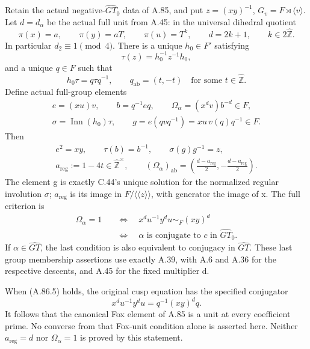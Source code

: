 Retain the actual negative-\(\widehat{GT}_0\) data of A.85,
and put \(z=(xy)^{-1}\), \(G_v=F\rtimes\langle v\rangle\).
Let \(d=d_\alpha\) be the actual full unit from A.45:
in the universal dihedral quotient
\[
 \pi(x)=a,\qquad\pi(y)=aT,\qquad\pi(u)=T^k,
 \qquad d=2k+1,\qquad k\in2\widehat{\mathbb Z}.
 \tag{A.86.1}
\]
In particular \(d_2\equiv1\pmod4\). There is a unique
\(h_0\in F'\) satisfying
\[
             \tau(z)=h_0^{-1}z^{-1}h_0,
\]
and a unique \(q\in F\) such that
\[
 h_0\tau=q\tau q^{-1},\qquad q_{\mathrm{ab}}=(t,-t)
       \quad\text{for some }t\in\widehat{\mathbb Z}.
 \tag{A.86.2}
\]
Define actual full-group elements
\[
 \begin{gathered}
 e=(xu)v,\qquad b=q^{-1}eq,\qquad
 \Omega_\alpha=(x^dv)b^{-d}\in F,\\
 \sigma=\operatorname{Inn}(h_0)\tau,\qquad
 g=e(qvq^{-1})=xu\,v(q)q^{-1}\in F.
 \end{gathered}
 \tag{A.86.3}
\]
Then
\[
 \begin{gathered}
 e^2=xy,\qquad\tau(b)=b^{-1},\qquad
 \sigma(g)g^{-1}=z,\\
 a_{\mathrm{reg}}:=1-4t\in\widehat{\mathbb Z}^{\times},\qquad
 (\Omega_\alpha)_{\mathrm{ab}}
   =\left(\frac{d-a_{\mathrm{reg}}}{2},
                  -\frac{d-a_{\mathrm{reg}}}{2}\right).
 \end{gathered}
 \tag{A.86.4}
\]
The element g is exactly C.44's unique solution for the normalized
regular involution \(\sigma\); \(a_{\mathrm{reg}}\) is its
image in \(F/\langle\!\langle z\rangle\!\rangle\), with
generator the image of x. The full criterion is
\[
 \begin{aligned}
 \Omega_\alpha=1
 &\quad\Longleftrightarrow\quad
 x^du^{-1}y^du\sim_F(xy)^d\\
 &\quad\Longleftrightarrow\quad
 \alpha\text{ is conjugate to }c\text{ in }\widehat{GT}_0.
 \end{aligned}
 \tag{A.86.5}
\]
If \(\alpha\in\widehat{GT}\), the last condition is also
equivalent to conjugacy in \(\widehat{GT}\). These last group
membership assertions use exactly A.39, with A.6 and A.36 for the
respective descents, and A.45 for the fixed multiplier d.

When (A.86.5) holds, the original cusp equation has the specified
conjugator
\[
       x^du^{-1}y^du=q^{-1}(xy)^dq.
 \tag{A.86.6}
\]
It follows that the canonical Fox element of A.85 is a unit at every
coefficient prime. No converse from that Fox-unit condition alone is
asserted here. Neither \(a_{\mathrm{reg}}=d\) nor
\(\Omega_\alpha=1\) is proved by this statement.

